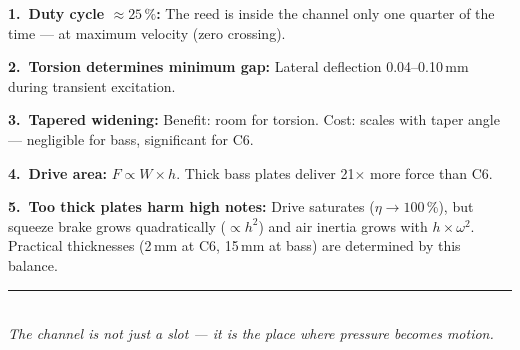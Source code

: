 \documentclass[11pt,a4paper]{article}
\begin{document}
\begin{keybox}
\textbf{1.\ Duty cycle $\approx 25\,\%$:} The reed is inside the channel only one quarter of the time --- at maximum velocity (zero crossing).

\textbf{2.\ Torsion determines minimum gap:} Lateral deflection 0.04--0.10\,mm during transient excitation.

\textbf{3.\ Tapered widening:} Benefit: room for torsion. Cost: scales with taper angle --- negligible for bass, significant for C6.

\textbf{4.\ Drive area:} $F \propto W \times h$. Thick bass plates deliver 21$\times$ more force than C6.

\textbf{5.\ Too thick plates harm high notes:} Drive saturates ($\eta \to 100\,\%$), but squeeze brake grows quadratically ($\propto h^2$) and air inertia grows with $h \times \omega^2$. Practical thicknesses (2\,mm at C6, 15\,mm at bass) are determined by this balance.
\end{keybox}

\vspace{3mm}
\begin{center}
\textcolor{accentred}{\rule{0.6\textwidth}{1pt}}\\[4pt]
{\small\itshape The channel is not just a slot --- it is the place where pressure becomes motion.}
\end{center}
\end{document}
